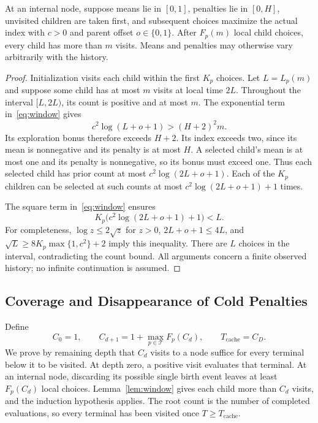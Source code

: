 \begin{lemma}
\label{lem:window}
At an internal node, suppose means lie in $[0,1]$, penalties lie in $[0,H]$, unvisited children are taken first, and subsequent choices maximize the actual index with $c>0$ and parent offset $o\in\{0,1\}$. After $F_p(m)$ local child choices, every child has more than $m$ visits. Means and penalties may otherwise vary arbitrarily with the history.
\end{lemma}
\begin{proof}
Initialization visits each child within the first $K_p$ choices. Let $L=L_p(m)$ and suppose some child has at most $m$ visits at local time $2L$. Throughout the interval $[L,2L)$, its count is positive and at most $m$. The exponential term in~\eqref{eq:window} gives
\[
 c^2\log(L+o+1)>(H+2)^2m.
\]
Its exploration bonus therefore exceeds $H+2$. Its index exceeds two, since its mean is nonnegative and its penalty is at most $H$. A selected child's mean is at most one and its penalty is nonnegative, so its bonus must exceed one. Thus each selected child has prior count at most $c^2\log(2L+o+1)$. Each of the $K_p$ children can be selected at such counts at most $c^2\log(2L+o+1)+1$ times.

The square term in~\eqref{eq:window} ensures
\[
 K_p\bigl(c^2\log(2L+o+1)+1\bigr)<L.
\]
For completeness, $\log z\le2\sqrt z$ for $z>0$, $2L+o+1\le4L$, and $\sqrt L\ge8K_p\max\{1,c^2\}+2$ imply this inequality. There are $L$ choices in the interval, contradicting the count bound. All arguments concern a finite observed history; no infinite continuation is assumed.
\end{proof}

\subsection{Coverage and Disappearance of Cold Penalties}
Define
\begin{equation}
 C_0=1,\qquad C_{d+1}=1+\max_{p\in\mathcal T}F_p(C_d),
 \qquad T_{\mathrm{cache}}=C_D.
 \label{eq:coverageconstant}
\end{equation}
We prove by remaining depth that $C_d$ visits to a node suffice for every terminal below it to be visited. At depth zero, a positive visit evaluates that terminal. At an internal node, discarding its possible single birth event leaves at least $F_p(C_d)$ local choices. Lemma~\ref{lem:window} gives each child more than $C_d$ visits, and the induction hypothesis applies. The root count is the number of completed evaluations, so every terminal has been visited once $T\ge T_{\mathrm{cache}}$.

